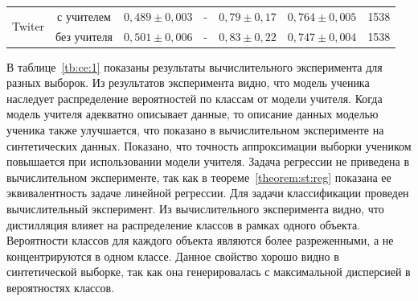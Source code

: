 \begin{table}[]
\begin{center}
{\begin{tabular}{|l|c|c|c|c|c|c|}
\multirow{2}{*}{Twiter}       & с учителем  & $0{,}489\pm0{,}003$                                               & -                                                                                             & $0{,}79\pm0{,}17$                                               & $0{,}764\pm0{,}005$ & 1538                                                       \\ \cline{2-7} 
                              & без учителя &  $0{,}501\pm0{,}006$                                                & -                                                                                             & $0{,}83\pm0{,}22$                                               & $0{,}747\pm0{,}004$ & 1538                                                       \\ \hline 
\end{tabular}
}
\end{center}
\end{table}

В таблице~\ref{tb:ce:1} 
показаны результаты вычислительного эксперимента для разных выборок. Из результатов эксперимента видно, что модель ученика наследует распределение вероятностей по классам от модели учителя. Когда модель учителя адекватно описывает данные, то описание данных моделью ученика также улучшается, что показано в вычислительном эксперименте на синтетических данных. Показано, что точность аппроксимации выборки учеником повышается при использовании модели учителя. Задача регрессии не приведена в вычислительном эксперименте, так как в теореме~\ref{theorem:st:reg} показана ее эквивалентность задаче линейной регрессии. Для задачи классификации проведен вычислительный эксперимент. Из вычислительного эксперимента видно, что дистилляция влияет на распределение классов в рамках одного объекта. Вероятности классов для каждого объекта являются более разреженными, а не концентрируются в одном классе. Данное свойство хорошо видно в синтетической выборке, так как она генерировалась с максимальной дисперсией в вероятностях классов.